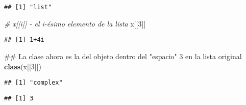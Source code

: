 \documentclass[]{article}
\newenvironment{Shaded}{\begin{snugshade}}{\end{snugshade}}
\newcommand{\KeywordTok}[1]{\textcolor[rgb]{0.13,0.29,0.53}{\textbf{#1}}}
\newcommand{\DecValTok}[1]{\textcolor[rgb]{0.00,0.00,0.81}{#1}}
\newcommand{\StringTok}[1]{\textcolor[rgb]{0.31,0.60,0.02}{#1}}
\newcommand{\CommentTok}[1]{\textcolor[rgb]{0.56,0.35,0.01}{\textit{#1}}}
\newcommand{\OperatorTok}[1]{\textcolor[rgb]{0.81,0.36,0.00}{\textbf{#1}}}
\newcommand{\NormalTok}[1]{#1}
\begin{document}
\begin{verbatim}
## [1] "list"
\end{verbatim}

\begin{Shaded}
\begin{Highlighting}[]
\CommentTok{# x[[i]] - el i-ésimo elemento de la lista}
\NormalTok{x[[}\DecValTok{3}\NormalTok{]]}
\end{Highlighting}
\end{Shaded}

\begin{verbatim}
## [1] 1+4i
\end{verbatim}

\begin{Shaded}
\begin{Highlighting}[]
\NormalTok{## La clase ahora es la del objeto dentro del "espacio" 3 en la lista original}
\KeywordTok{class}\NormalTok{(x[[}\DecValTok{3}\NormalTok{]])}
\end{Highlighting}
\end{Shaded}

\begin{verbatim}
## [1] "complex"
\end{verbatim}

\begin{Shaded}
\end{Shaded}

\begin{verbatim}
## [1] 3
\end{verbatim}

\begin{Shaded}
\end{Shaded}
\end{document}
